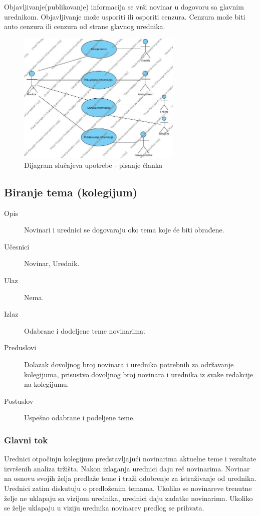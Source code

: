 Objavljivanje(publikovanje) informacija se vrši novinar u dogovoru sa glavnim u\-red\-ni\-kom. Objavljivanje može usporiti ili osporiti cenzura. Cenzura može biti auto cenzura ili cenzura od strane glavnog urednika. \\


\begin{figure}[h]
    \centering
    \includegraphics[width=0.7\textwidth]{slike/pisanje}
    \caption{Dijagram slučajeva upotrebe - pisanje članka}
    \label{pisanje}
\end{figure}

\subsection{Biranje tema (kolegijum)}

\begin{description}
\item [Opis] Novinari i urednici se dogovaraju oko tema koje će biti obrađene.
\item [Učesnici] Novinar, Urednik.
\item [Ulaz] Nema.
\item [Izlaz] Odabrane i dodeljene teme novinarima.
\item [Preduslovi] Dolazak dovoljnog broj novinara i urednika potrebnih za održavanje kolegijuma, prisustvo dovoljnog broj  novinara i urednika iz svake redakcije na kolegijumu.
\item [Postuslov] Uspešno odabrane i podeljene teme.
\end{description}      

\subsubsection{Glavni tok}
Urednici otpočinju kolegijum predstavljajući novinarima aktuelne teme i rezultate izvršenih analiza tržišta. Nakon izlaganja urednici daju reč novinarima. Novinar na osnovu svojih želja predlaže teme i traži odobrenje za istraživanje od urednika. Urednici zatim diskutuju o predloženim temama. Ukoliko se novinareve trenutne želje ne uklapaju sa vizijom urednika, urednici daju zadatke novinarima. Ukoliko se želje uklapaju u viziju urednika novinarev predlog se prihvata.
